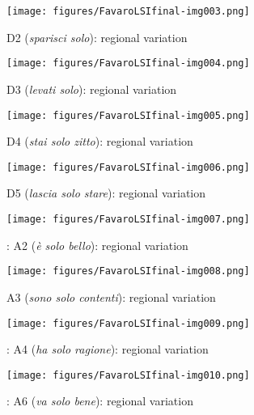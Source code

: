 \begin{figure}[p]
\texttt{[image: figures/FavaroLSIfinal-img003.png]}

\caption{\label{fig:key:8.3} D2 (\textit{sparisci solo}): regional variation}
\end{figure}

\begin{figure}[p]
\texttt{[image: figures/FavaroLSIfinal-img004.png]}

\caption{\label{fig:key:8.4} D3 (\textit{levati solo}): regional variation}
\end{figure}

\begin{figure}[p]
\texttt{[image: figures/FavaroLSIfinal-img005.png]}

\caption{\label{fig:key:8.5} D4 (\textit{stai solo zitto}): regional variation}
\end{figure}

\begin{figure}[p]
\texttt{[image: figures/FavaroLSIfinal-img006.png]}

\caption{\label{fig:key:8.6} D5 (\textit{lascia solo stare}): regional variation}
\end{figure}

\begin{figure}[p]
\texttt{[image: figures/FavaroLSIfinal-img007.png]}

\caption{\label{fig:key:8.7}: A2 (\textit{è solo bello}): regional variation}
\end{figure}

\begin{figure}[p]
\texttt{[image: figures/FavaroLSIfinal-img008.png]}

\caption{\label{fig:key:8.8} A3 (\textit{sono solo contenti}): regional variation}
\end{figure}

\begin{figure}[p]
\texttt{[image: figures/FavaroLSIfinal-img009.png]}

\caption{\label{fig:key:8.9}: A4 (\textit{ha solo ragione}): regional variation}
\end{figure}

\begin{figure}[p]
\texttt{[image: figures/FavaroLSIfinal-img010.png]}

\caption{\label{fig:key:8.10}: A6 (\textit{va solo bene}): regional variation}
\end{figure}


